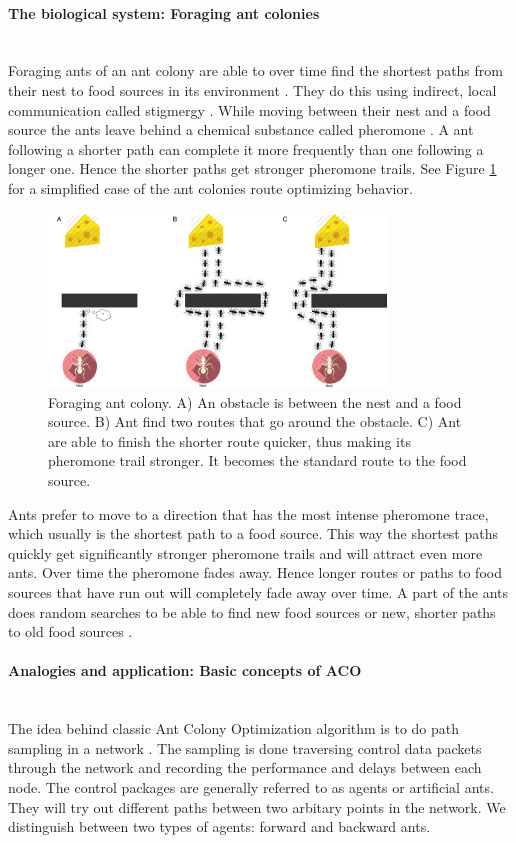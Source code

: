 \documentclass[cameraready]{IWORK2014}
\begin{document}
\paragraph{The biological system: Foraging ant colonies}~\\
Foraging ants of an ant colony are able to over time find the shortest paths from their nest to food sources in its environment \cite{dorigo1999ant, goss1989self}. They do this using indirect, local communication called stigmergy \cite{grasse1959reconstruction}. While moving between their nest and a food source the ants leave behind a chemical substance called pheromone \cite{ghosh2008aggregation}. A ant following a shorter path can complete it more frequently than one following a longer one. Hence the shorter paths get stronger pheromone trails. See Figure \ref{fig:aco} for a simplified case of the ant colonies route optimizing behavior.

\begin{figure}
    \centering
    \includegraphics[width=0.8\textwidth]{aco.png}
    \caption{Foraging ant colony. A) An obstacle is between the nest and a food source. B) Ant find two routes that go around the obstacle. C) Ant are able to finish the shorter route quicker, thus making its pheromone trail stronger. It becomes the standard route to the food source.}
    \label{fig:aco}
\end{figure} 

Ants prefer to move to a direction that has the most intense pheromone trace, which usually is the shortest path to a food source. This way the shortest paths quickly get significantly stronger pheromone trails and will attract even more ants. Over time the pheromone fades away. Hence longer routes or paths to food sources that have run out will completely fade away over time. A part of the ants does random searches to be able to find new food sources or new, shorter paths to old food sources \cite{dressler2010bio}.

\paragraph{Analogies and application: Basic concepts of ACO}~\\
The idea behind classic Ant Colony Optimization algorithm is to do path sampling in a network \cite{di2004ant, di2008theory}. The sampling is done traversing control data packets through the network and recording the performance and delays between each node. The control packages are generally referred to as agents or artificial ants. They will try out different paths between two arbitary points in the network. We distinguish between two types of agents: forward and backward ants.
\end{document}
